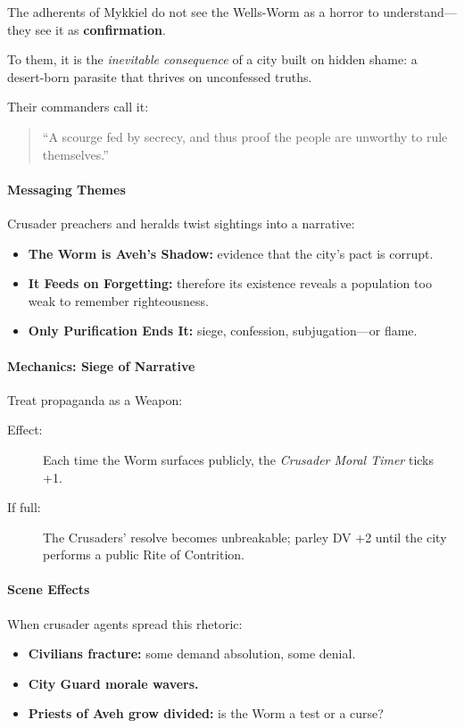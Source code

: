 \documentclass[11pt]{article}
\begin{document}
The adherents of Mykkiel do not see the Wells-Worm as a horror to
understand---they see it as \textbf{confirmation}.

To them, it is the \emph{inevitable consequence} of a city built on hidden
shame: a desert-born parasite that thrives on unconfessed truths.

Their commanders call it:

\begin{quote}
  ``A scourge fed by secrecy, and thus proof the people are unworthy to rule
  themselves.''
\end{quote}

\paragraph{Messaging Themes}
Crusader preachers and heralds twist sightings into a narrative:

\begin{itemize}
  \item \textbf{The Worm is Aveh's Shadow:} evidence that the city's pact is corrupt.
  \item \textbf{It Feeds on Forgetting:} therefore its existence reveals a population
    too weak to remember righteousness.
  \item \textbf{Only Purification Ends It:} siege, confession, subjugation---or flame.
\end{itemize}

\paragraph{Mechanics: Siege of Narrative}
Treat propaganda as a Weapon:

\begin{description}
  \item[Effect:] Each time the Worm surfaces publicly, the \emph{Crusader Moral Timer }
    ticks +1.
  \item[If full:] The Crusaders' resolve becomes unbreakable; parley DV +2 until the
    city performs a public Rite of Contrition.
\end{description}

\paragraph{Scene Effects}
When crusader agents spread this rhetoric:

\begin{itemize}
  \item \textbf{Civilians fracture:} some demand absolution, some denial.
  \item \textbf{City Guard morale wavers.}
  \item \textbf{Priests of Aveh grow divided:} is the Worm a test or a curse?
\end{itemize}
\end{document}
